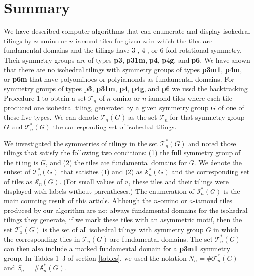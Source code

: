 \documentclass{ws-ijcga}
\begin{document}
\section{Summary}
We have described computer algorithms that can enumerate and display isohedral tilings by 
$n$-omino or $n$-iamond tiles for given $n$ in which the tiles are fundamental domains and the tilings
have 3-, 4-, or 6-fold rotational symmetry. 
Their symmetry groups are of types {\bf p3}, {\bf p31m}, {\bf p4}, {\bf p4g}, and {\bf p6}. 
We have shown that there are no isohedral tilings with symmetry groups of types
{\bf p3m1}, {\bf p4m}, or {\bf p6m} that have polyominoes or polyiamonds as fundamental domains. 
For symmetry groups of types {\bf p3}, {\bf p31m}, {\bf p4}, {\bf p4g}, 
and {\bf p6} we used the backtracking Procedure 1 to obtain a set $\mathscr{T}_n$ of $n$-omino 
or $n$-iamond tiles where each tile produced one isohedral tiling,
generated by a given symmetry group $G$ of one of these five types. 
We can denote $\mathscr{T}_{n}(G)$ as the set $\mathscr{T}_n$ for that symmetry group $G$ 
and $\mathscr{T}^{*}_{n}(G)$ the corresponding set of isohedral tilings.

We investigated the symmetries of tilings in the set $\mathscr{T}^{*}_{n}(G)$ and noted those tilings that
satisfy the following two conditions: 
(1) the full symmetry group of the tiling is $G$, and 
(2) the tiles are fundamental domains for $G$. 
We denote the subset of $\mathscr{T}^{*}_{n}(G)$ that satisfies (1) and (2)
as $\mathscr{S}^{*}_{n}(G)$ and the corresponding set of tiles as $\mathscr{S}_{n}(G)$. 
(For small values of $n$, these tiles and their tilings were displayed with labels without parentheses.) 
The enumeration of $\mathscr{S}^{*}_{n}(G)$ is the main counting result of this article. 
Although the $n$-omino or $n$-iamond tiles produced by our algorithm are not 
always fundamental domains for the isohedral tilings they generate, if we mark
these tiles with an asymmetric motif, then the set $\mathscr{T}^{*}_{n}(G)$ is the set of all isohedral tilings with
symmetry group $G$ in which the corresponding tiles in $\mathscr{T}_{n}(G)$ are fundamental domains. 
The set $\mathscr{T}^{*}_{n}(G)$ can then also include a marked fundamental domain for a {\bf p3m1} symmetry group. 
In Tables 1--3 of section \ref{tables}, we used the notation $N_n=\#\mathscr{T}^{*}_{n}(G)$ and 
$S_n=\#\mathscr{S}^{*}_{n}(G)$.
\end{document}
